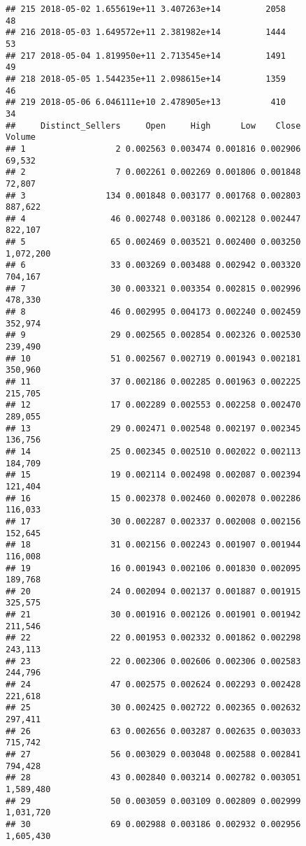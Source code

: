 \documentclass[]{article}
\begin{document}
\begin{verbatim}
## 215 2018-05-02 1.655619e+11 3.407263e+14         2058              48
## 216 2018-05-03 1.649572e+11 2.381982e+14         1444              53
## 217 2018-05-04 1.819950e+11 2.713545e+14         1491              49
## 218 2018-05-05 1.544235e+11 2.098615e+14         1359              46
## 219 2018-05-06 6.046111e+10 2.478905e+13          410              34
##     Distinct_Sellers     Open     High      Low    Close        Volume
## 1                  2 0.002563 0.003474 0.001816 0.002906        69,532
## 2                  7 0.002261 0.002269 0.001806 0.001848        72,807
## 3                134 0.001848 0.003177 0.001768 0.002803       887,622
## 4                 46 0.002748 0.003186 0.002128 0.002447       822,107
## 5                 65 0.002469 0.003521 0.002400 0.003250     1,072,200
## 6                 33 0.003269 0.003488 0.002942 0.003320       704,167
## 7                 30 0.003321 0.003354 0.002815 0.002996       478,330
## 8                 46 0.002995 0.004173 0.002240 0.002459       352,974
## 9                 29 0.002565 0.002854 0.002326 0.002530       239,490
## 10                51 0.002567 0.002719 0.001943 0.002181       350,960
## 11                37 0.002186 0.002285 0.001963 0.002225       215,705
## 12                17 0.002289 0.002553 0.002258 0.002470       289,055
## 13                29 0.002471 0.002548 0.002197 0.002345       136,756
## 14                25 0.002345 0.002510 0.002022 0.002113       184,709
## 15                19 0.002114 0.002498 0.002087 0.002394       121,404
## 16                15 0.002378 0.002460 0.002078 0.002286       116,033
## 17                30 0.002287 0.002337 0.002008 0.002156       152,645
## 18                31 0.002156 0.002243 0.001907 0.001944       116,008
## 19                16 0.001943 0.002106 0.001830 0.002095       189,768
## 20                24 0.002094 0.002137 0.001887 0.001915       325,575
## 21                30 0.001916 0.002126 0.001901 0.001942       211,546
## 22                22 0.001953 0.002332 0.001862 0.002298       243,113
## 23                22 0.002306 0.002606 0.002306 0.002583       244,796
## 24                47 0.002575 0.002624 0.002293 0.002428       221,618
## 25                30 0.002425 0.002722 0.002365 0.002632       297,411
## 26                63 0.002656 0.003287 0.002635 0.003033       715,742
## 27                56 0.003029 0.003048 0.002588 0.002841       794,428
## 28                43 0.002840 0.003214 0.002782 0.003051     1,589,480
## 29                50 0.003059 0.003109 0.002809 0.002999     1,031,720
## 30                69 0.002988 0.003186 0.002932 0.002956     1,605,430

\end{verbatim}
\end{document}
